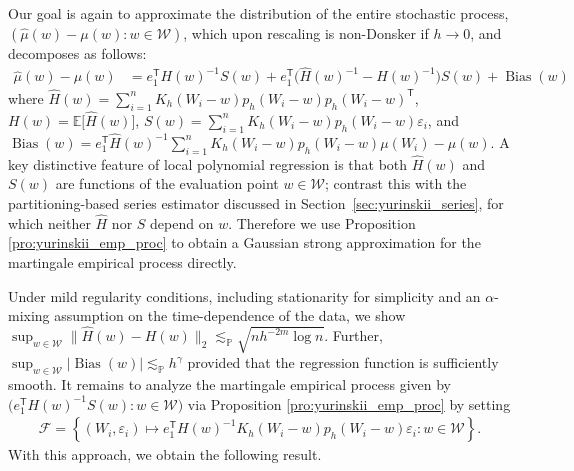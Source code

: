 \documentclass[11pt,lof]{puthesis}
\renewcommand{\P}{\ensuremath{\mathbb{P}}}
\newcommand{\E}{\ensuremath{\mathbb{E}}}
\newcommand{\cF}{\ensuremath{\mathcal{F}}}
\newcommand{\cW}{\ensuremath{\mathcal{W}}}
\newcommand{\T}{\ensuremath{\mathsf{T}}}
\DeclareMathOperator{\Bias}{Bias}
\theoremstyle{break}
\theoremstyle{proof}
\begin{document}
Our goal is again to approximate the distribution of the entire stochastic
process, $(\hat{\mu}(w)-\mu(w):w\in\cW)$, which upon rescaling is non-Donsker
if $h \to 0$, and decomposes as follows:
%
\begin{align*}
  \hat{\mu}(w)-\mu(w)
  &= e_1^\T H(w)^{-1} S(w)
  + e_1^\T \big(\hat H(w)^{-1} - H(w)^{-1}\big) S(w)
  + \Bias(w)
\end{align*}
%
where $\hat H(w) = \sum_{i=1}^n K_h(W_i-w) p_h(W_i-w) p_h(W_i-w)^\T$, $H(w) = \E
\big[ \hat H(w) \big]$, $S(w)= \sum_{i=1}^n K_h(W_i-w) p_h(W_i-w)
\varepsilon_i$, and $\Bias(w) = e_1^\T \hat H(w)^{-1}
\sum_{i=1}^n K_h(W_i-w) p_h(W_i-w) \mu(W_i) - \mu(w)$.
A key distinctive feature of local polynomial regression is that both
$\hat H(w)$ and $S(w)$ are functions of the evaluation point $w\in\cW$;
contrast this with the partitioning-based series estimator discussed in
Section~\ref{sec:yurinskii_series}, for which neither $\hat H$ nor $S$ depend
on $w$.
Therefore we use Proposition \ref{pro:yurinskii_emp_proc} to obtain a Gaussian
strong approximation for the martingale empirical process directly.

Under mild regularity conditions, including stationarity for simplicity
and an $\alpha$-mixing assumption on the time-dependence of the data, we show
$\sup_{w\in\cW} \|\hat H(w)-H(w)\|_2
\lesssim_\P \sqrt{n h^{-2m}\log n}$.
Further,
$\sup_{w\in\cW} |\Bias(w)|
\lesssim_\P h^\gamma$
provided that the regression function is sufficiently smooth.
It remains to analyze the martingale empirical process given by
$\big(e_1^\T H(w)^{-1} S(w) : w\in\cW\big)$
via Proposition \ref{pro:yurinskii_emp_proc} by setting
%
\begin{align*}
  \cF = \left\{
    (W_i, \varepsilon_i) \mapsto
    e_1^\T H(w)^{-1}
    K_h(W_i-w) p_h(W_i-w) \varepsilon_i
    : w \in \cW
  \right\}.
\end{align*}
%
With this approach, we obtain the following result.
\end{document}
